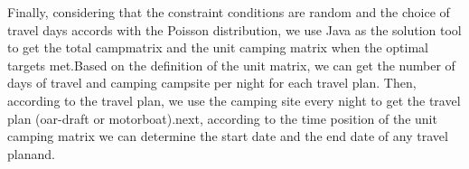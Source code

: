 $$\par Finally, considering that the constraint conditions are random and the choice of travel days accords with the Poisson distribution, we use Java as the solution tool to get the total campmatrix and the unit camping matrix when the optimal targets met.Based on the definition of the unit matrix, we can get the number of days of travel and camping campsite per night for each travel plan. Then, according to the travel plan, we use the camping site every night to get the travel plan (oar-draft or motorboat).next, according to the time position of the unit camping matrix we can determine the start date and the end date of any travel planand.